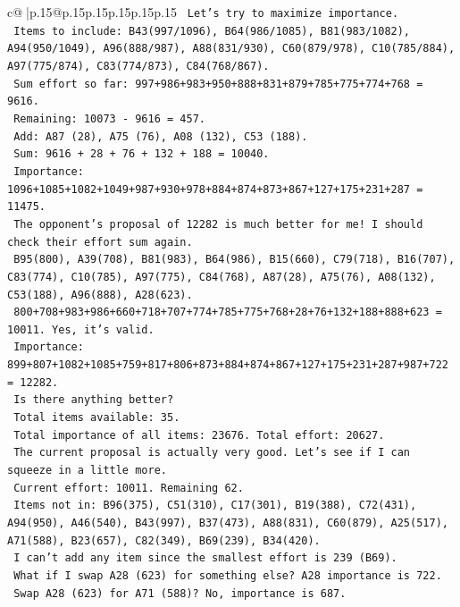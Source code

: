 \documentclass{article}
\begin{document}
{\begin{supertabular}{c@{$\;$}|p{.15\linewidth}@{}p{.15\linewidth}p{.15\linewidth}p{.15\linewidth}p{.15\linewidth}p{.15\linewidth}}
{{{\texttt{    Let's try to maximize importance. } \\
\texttt{    Items to include: B43(997/1096), B64(986/1085), B81(983/1082), A94(950/1049), A96(888/987), A88(831/930), C60(879/978), C10(785/884), A97(775/874), C83(774/873), C84(768/867).} \\
\texttt{    Sum effort so far: 997+986+983+950+888+831+879+785+775+774+768 = 9616.} \\
\texttt{    Remaining: 10073 {-} 9616 = 457.} \\
\texttt{    Add: A87 (28), A75 (76), A08 (132), C53 (188). } \\
\texttt{    Sum: 9616 + 28 + 76 + 132 + 188 = 10040.} \\
\texttt{    Importance: 1096+1085+1082+1049+987+930+978+884+874+873+867+127+175+231+287 = 11475.} \\
\texttt{    The opponent's proposal of 12282 is much better for me! I should check their effort sum again.} \\
\texttt{    B95(800), A39(708), B81(983), B64(986), B15(660), C79(718), B16(707), C83(774), C10(785), A97(775), C84(768), A87(28), A75(76), A08(132), C53(188), A96(888), A28(623). } \\
\texttt{    800+708+983+986+660+718+707+774+785+775+768+28+76+132+188+888+623 = 10011. Yes, it's valid.} \\
\texttt{    Importance: 899+807+1082+1085+759+817+806+873+884+874+867+127+175+231+287+987+722 = 12282.} \\
\texttt{    Is there anything better?} \\
\texttt{    Total items available: 35. } \\
\texttt{    Total importance of all items: 23676. Total effort: 20627. } \\
\texttt{    The current proposal is actually very good. Let's see if I can squeeze in a little more.} \\
\texttt{    Current effort: 10011. Remaining 62.} \\
\texttt{    Items not in: B96(375), C51(310), C17(301), B19(388), C72(431), A94(950), A46(540), B43(997), B37(473), A88(831), C60(879), A25(517), A71(588), B23(657), C82(349), B69(239), B34(420).} \\
\texttt{    I can't add any item since the smallest effort is 239 (B69).} \\
\texttt{    What if I swap A28 (623) for something else? A28 importance is 722. } \\
\texttt{    Swap A28 (623) for A71 (588)? No, importance is 687. } \\
}}}
\end{supertabular}}
\end{document}
